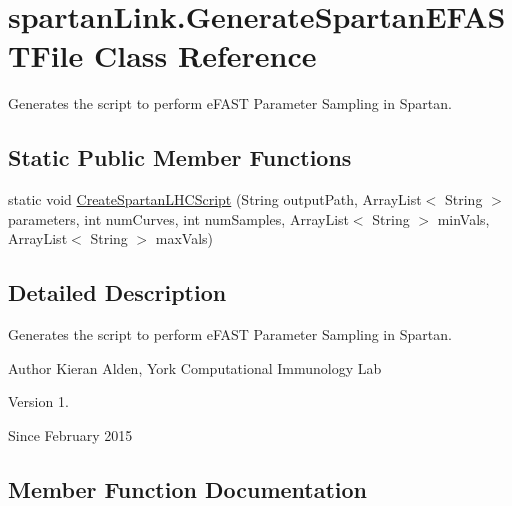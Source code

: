 \hypertarget{classspartanLink_1_1GenerateSpartanEFASTFile}{}\section{spartan\+Link.\+Generate\+Spartan\+E\+F\+A\+S\+T\+File Class Reference}
\label{classspartanLink_1_1GenerateSpartanEFASTFile}


Generates the script to perform e\+F\+A\+S\+T Parameter Sampling in Spartan.  


\subsection*{Static Public Member Functions}
\begin{DoxyCompactItemize}
\item 
static void \hyperlink{classspartanLink_1_1GenerateSpartanEFASTFile_ab038ce932b1d4bbc756f6e1626e6a50b}{Create\+Spartan\+L\+H\+C\+Script} (String output\+Path, Array\+List$<$ String $>$ parameters, int num\+Curves, int num\+Samples, Array\+List$<$ String $>$ min\+Vals, Array\+List$<$ String $>$ max\+Vals)
\end{DoxyCompactItemize}


\subsection{Detailed Description}
Generates the script to perform e\+F\+A\+S\+T Parameter Sampling in Spartan. 

\begin{DoxyAuthor}{Author}
Kieran Alden, York Computational Immunology Lab 
\end{DoxyAuthor}
\begin{DoxyVersion}{Version}
1. 
\end{DoxyVersion}
\begin{DoxySince}{Since}
February 2015 
\end{DoxySince}


\subsection{Member Function Documentation}
\hypertarget{classspartanLink_1_1GenerateSpartanEFASTFile_ab038ce932b1d4bbc756f6e1626e6a50b}{}
